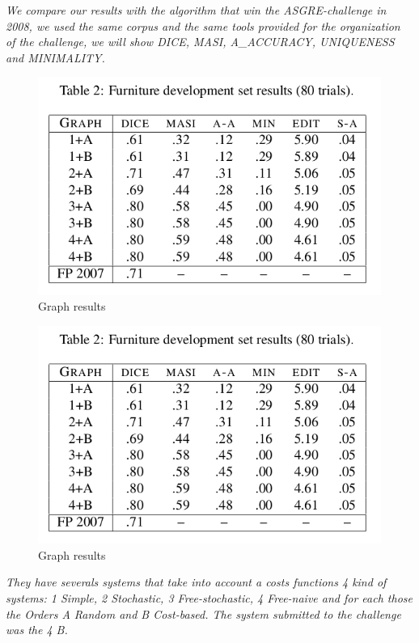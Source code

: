 \textit{We compare our results with the algorithm that win the ASGRE-challenge in 2008, we used the same corpus and the same tools provided for the organization of the challenge, we will show DICE, MASI, A\_ACCURACY, UNIQUENESS and MINIMALITY. \cite{graph08}}

\begin{figure}[h!]
\begin{center}
\includegraphics[width=.7\textwidth]{images/graphResults.jpg}
\end{center}
\vspace*{-2em}
\caption{Graph results \label{graphResults}}
\end{figure}

\begin{figure}[h!]
\begin{center}
\includegraphics[width=.7\textwidth]{images/graphResults.jpg}
\end{center}
\vspace*{-2em}
\caption{Graph results \label{graphResults2}}
\end{figure}

\textit{They have severals systems that take into account a costs functions 4 kind of systems: 1 Simple, 2 Stochastic, 3 Free-stochastic, 4 Free-naive and for each those the Orders A Random and B Cost-based. The system submitted to the challenge was the 4 B.}\\


